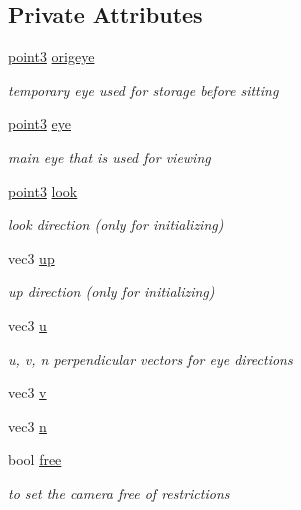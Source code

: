 \subsection*{Private Attributes}
\begin{DoxyCompactItemize}
\item 
\hyperlink{classpoint3}{point3} \hyperlink{classcamera_ad21174a87a185a1054d54bac123abe9a}{origeye}
\begin{DoxyCompactList}\small\item\em temporary eye used for storage before sitting \end{DoxyCompactList}\item 
\hyperlink{classpoint3}{point3} \hyperlink{classcamera_aede6d35595e9ea8c98383915fb8f743d}{eye}
\begin{DoxyCompactList}\small\item\em main eye that is used for viewing \end{DoxyCompactList}\item 
\hyperlink{classpoint3}{point3} \hyperlink{classcamera_af59702993fada81bbb53e3fb287cc642}{look}
\begin{DoxyCompactList}\small\item\em look direction (only for initializing) \end{DoxyCompactList}\item 
vec3 \hyperlink{classcamera_a1d4c89c9cc2e4be93650f3a1f94c4555}{up}
\begin{DoxyCompactList}\small\item\em up direction (only for initializing) \end{DoxyCompactList}\item 
vec3 \hyperlink{classcamera_a610b4723a2dc8dbeefc815fe99116719}{u}
\begin{DoxyCompactList}\small\item\em u, v, n perpendicular vectors for eye directions \end{DoxyCompactList}\item 
vec3 \hyperlink{classcamera_a056e047e57d62a35813f8c5d7bfa78cb}{v}
\item 
vec3 \hyperlink{classcamera_ae436426eba7093f7260b5ca5db6c0068}{n}
\item 
bool \hyperlink{classcamera_ab46ae945b6f431f98ba4de772c50d62d}{free}
\begin{DoxyCompactList}\small\item\em to set the camera free of restrictions \end{DoxyCompactList}\item 

\end{DoxyCompactItemize}
